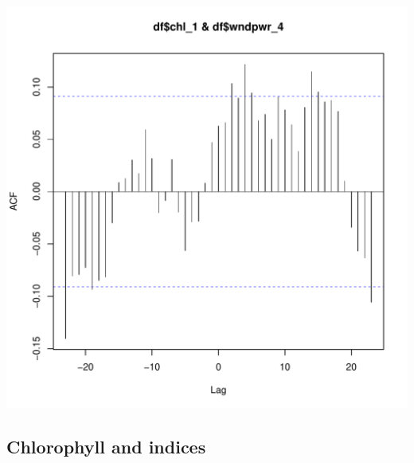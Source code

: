 \documentclass{article}\usepackage[]{graphicx}\usepackage[]{color}
\makeatletter
\def\maxwidth{ %
  \ifdim\Gin@nat@width>\linewidth
    \linewidth
  \else
    \Gin@nat@width
  \fi
}
\newenvironment{knitrout}{}{} %
\makeatother
\begin{document}
\begin{knitrout}
\includegraphics[width=\maxwidth]{figure/unnamed-chunk-30-2} 

\end{knitrout}

\subsection{Chlorophyll and indices}
\end{document}

